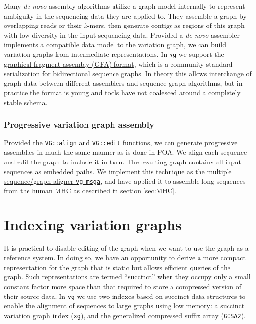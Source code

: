 \documentclass[12pt]{article}
\begin{document}
Many \emph{de novo} assembly algorithms utilize a graph model internally to represent ambiguity in the sequencing data they are applied to.
They assemble a graph by overlapping reads or their $k$-mers, then generate contigs as regions of this graph with low diversity in the input sequencing data.
Provided a \emph{de novo} assembler implements a compatible data model to the variation graph, we can build variation graphs from intermediate representations.
In {\tt vg} we support the \href{https://github.com/pmelsted/GFA-spec}{graphical fragment assembly (GFA) format}, which is a community standard serialization for bidirectional sequence graphs.
In theory this allows interchange of graph data between different assemblers and sequence graph algorithms, but in practice the format is young and tools have not coalesced around a completely stable schema.

\subsubsection{Progressive variation graph assembly}

Provided the {\tt VG::align} and {\tt VG::edit} functions, we can generate progressive assemblies in much the same manner as is done in POA.
We align each sequence and edit the graph to include it in turn.
The resulting graph contains all input sequences as embedded paths.
We implement this technique as the \href{https://github.com/vgteam/vg/blob/fbcb6e62/src/main.cpp#L674-L1248}{multiple sequence/graph aligner {\tt vg msga}}, and have applied it to assemble long sequences from the human MHC as described in section \ref{sec:MHC}.

\section{Indexing variation graphs}

It is practical to disable editing of the graph when we want to use the graph as a reference system.
In doing so, we have an opportunity to derive a more compact representation for the graph that is static but allows efficient queries of the graph.
Such representations are termed ``succinct'' when they occupy only a small constant factor more space than that required to store a compressed version of their source data.
In {\tt vg} we use two indexes based on succinct data structures to enable the alignment of sequences to large graphs using low memory: a succinct variation graph index ({\tt xg}), and the generalized compressed suffix array ({\tt GCSA2}).
\end{document}
